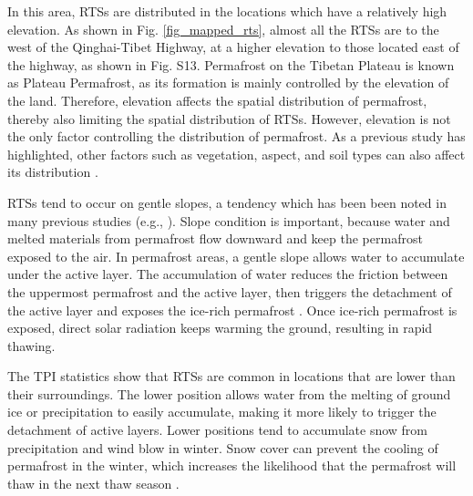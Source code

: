 \documentclass[authoryear,preprint,review,12pt]{elsarticle}
\begin{document}




In this area, RTSs are distributed in the locations which have a relatively high elevation.
As shown in Fig. \ref{fig_mapped_rts}, almost all the RTSs are to the west of the Qinghai-Tibet Highway, at a higher elevation to those located east of the highway, as shown in Fig. S13. Permafrost on the Tibetan Plateau is known as Plateau Permafrost, as its formation is mainly controlled by the elevation of the land. Therefore, elevation affects the spatial distribution of permafrost, thereby also limiting the spatial distribution of RTSs. However, elevation is not the only factor controlling the distribution of permafrost. As a previous study has highlighted, other factors such as vegetation, aspect, and soil types can also affect its distribution \citep{yin2017effects}.

RTSs tend to occur on gentle slopes, a tendency which has been been noted in many previous studies (e.g., \citealp{leibman1995cryogenic, niu2014thaw, lacelle_distribution_2015}). Slope condition is important, because water and melted materials from permafrost flow downward and keep the permafrost exposed to the air. In permafrost areas, a gentle slope allows water to accumulate under the active layer. The accumulation of water reduces the friction between the uppermost permafrost and the active layer,  then triggers the detachment of the active layer and exposes the ice-rich permafrost \citep{mcroberts1974stability, mcroberts1974the}. Once ice-rich permafrost is exposed, direct solar radiation keeps warming the ground, resulting in rapid thawing.

The TPI statistics show that RTSs are common in locations that are lower than their surroundings. The lower position allows water from the melting of ground ice or precipitation to easily accumulate, making it more likely to trigger the detachment of active layers. Lower positions tend to accumulate snow from precipitation and wind blow in winter. Snow cover can prevent the cooling of permafrost in the winter, which increases the likelihood that the permafrost will thaw in the next thaw season \citep{stieglitz2003role}. 
\end{document}
